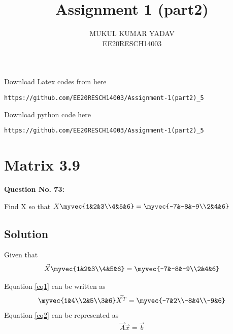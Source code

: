 \documentclass[journal,12pt,twocolumn]{IEEEtran}
\begin{document}
     \def\rightbox#1{\makebox[0in][r]{#1}}
     \def\centbox#1{\makebox[0in]{#1}}
     \def\topbox#1{\raisebox{-\baselineskip}[0in][0in]{#1}}
     \def\midbox#1{\raisebox{-0.5\baselineskip}[0in][0in]{#1}}
\vspace{3cm}
\title{Assignment 1 (part2)}
\author{MUKUL KUMAR YADAV\\ EE20RESCH14003}
\maketitle
\newpage
\bigskip
\renewcommand{\thefigure}{\theenumi}
\renewcommand{\thetable}{\theenumi}
 Download Latex codes from here
\begin{lstlisting}
https://github.com/EE20RESCH14003/Assignment-1(part2)_5
\end{lstlisting}
Download python code here
\begin{lstlisting}
https://github.com/EE20RESCH14003/Assignment-1(part2)_5
\end{lstlisting}

%

%
\section{\textbf{ Matrix 3.9}}
\textbf{Question No. 73:} 

Find X so that $X\myvec{1&2&3\\4&5&6}=\myvec{-7&-8&-9\\2&4&6}$

\subsection{\textbf{Solution}}

Given that 
\begin{align}\label{eq1}
\Vec{X}\myvec{1&2&3\\4&5&6}=\myvec{-7&-8&-9\\2&4&6}
\end{align}

Equation \eqref{eq1} can be written as 
\begin{align}\label{eq2}
\myvec{1&4\\2&5\\3&6}\Vec{X^T}=\myvec{-7&2\\-8&4\\-9&6}
\end{align}
Equation \eqref{eq2} can be represented as 
\begin{align}\label{eq3}
\vec{A}\vec{x}=\vec{b}
\end{align}
\end{document}
